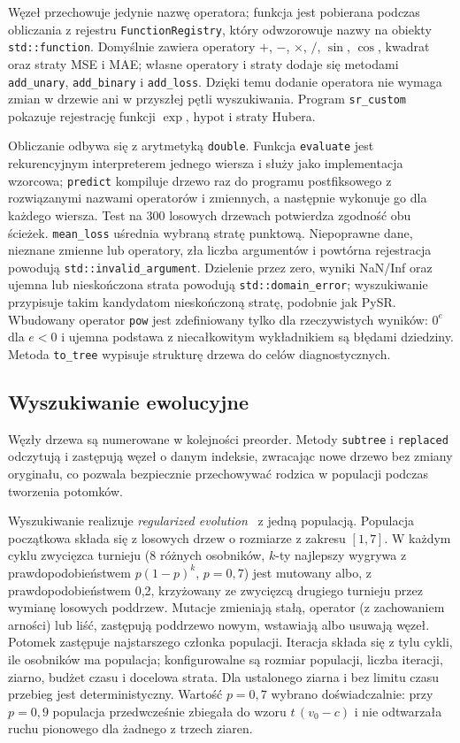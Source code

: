\documentclass[11pt,a4paper]{article}
\begin{document}
Węzeł przechowuje jedynie nazwę operatora; funkcja jest pobierana podczas
obliczania z rejestru \texttt{FunctionRegistry}, który odwzorowuje nazwy na
obiekty \texttt{std::function}. Domyślnie zawiera operatory $+$, $-$,
$\times$, $/$, $\sin$, $\cos$, kwadrat oraz straty MSE i MAE; własne operatory
i straty dodaje się metodami \texttt{add\_unary}, \texttt{add\_binary}
i \texttt{add\_loss}. Dzięki temu dodanie operatora nie wymaga zmian
w drzewie ani w przyszłej pętli wyszukiwania. Program \texttt{sr\_custom}
pokazuje rejestrację funkcji $\exp$, $\mathrm{hypot}$ i straty Hubera.

Obliczanie odbywa się z arytmetyką \texttt{double}. Funkcja \texttt{evaluate}
jest rekurencyjnym interpreterem jednego wiersza i służy jako implementacja
wzorcowa; \texttt{predict} kompiluje drzewo raz do programu postfiksowego
z rozwiązanymi nazwami operatorów i zmiennych, a następnie wykonuje go dla
każdego wiersza. Test na 300 losowych drzewach potwierdza zgodność obu ścieżek.
\texttt{mean\_loss}
uśrednia wybraną stratę punktową. Niepoprawne dane, nieznane zmienne lub
operatory, zła liczba argumentów i powtórna rejestracja powodują
\texttt{std::invalid\_argument}. Dzielenie przez zero, wyniki NaN/Inf
oraz ujemna lub nieskończona strata powodują \texttt{std::domain\_error};
wyszukiwanie przypisuje takim kandydatom nieskończoną stratę, podobnie jak PySR.
Wbudowany operator \texttt{pow} jest zdefiniowany tylko dla rzeczywistych
wyników: $0^e$ dla $e<0$ i ujemna podstawa z niecałkowitym wykładnikiem są
błędami dziedziny. Metoda \texttt{to\_tree} wypisuje
strukturę drzewa do celów diagnostycznych.

\subsection{Wyszukiwanie ewolucyjne}
Węzły drzewa są numerowane w kolejności preorder. Metody \texttt{subtree}
i \texttt{replaced} odczytują i zastępują węzeł o danym indeksie, zwracając
nowe drzewo bez zmiany oryginału, co pozwala bezpiecznie przechowywać rodzica
w populacji podczas tworzenia potomków.

Wyszukiwanie realizuje \emph{regularized evolution}~\cite{real} z jedną
populacją. Populacja początkowa składa się z losowych drzew o rozmiarze
z zakresu $[1,7]$. W każdym cyklu zwycięzca turnieju (8 różnych osobników,
$k$-ty najlepszy wygrywa z prawdopodobieństwem $p(1-p)^k$, $p=0{,}7$) jest
mutowany albo, z prawdopodobieństwem 0,2, krzyżowany ze zwycięzcą drugiego
turnieju przez wymianę losowych poddrzew. Mutacje zmieniają stałą, operator
(z zachowaniem arności) lub liść, zastępują poddrzewo nowym, wstawiają albo
usuwają węzeł. Potomek zastępuje najstarszego członka populacji. Iteracja
składa się z tylu cykli, ile osobników ma populacja; konfigurowalne są
rozmiar populacji, liczba iteracji, ziarno, budżet czasu i docelowa strata.
Dla ustalonego ziarna i bez limitu czasu przebieg jest deterministyczny.
Wartość $p=0{,}7$ wybrano doświadczalnie: przy $p=0{,}9$ populacja
przedwcześnie zbiegała do wzoru $t\,(v_0-c)$ i nie odtwarzała ruchu pionowego
dla żadnego z trzech ziaren.
\end{document}

